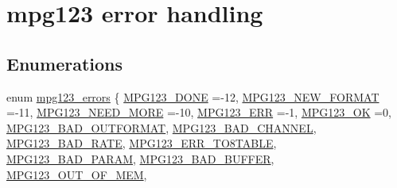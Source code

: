 \hypertarget{group__mpg123__error}{}\section{mpg123 error handling}
\label{group__mpg123__error}
\subsection*{Enumerations}
\begin{DoxyCompactItemize}
\item 
enum \hyperlink{group__mpg123__error_gac50432012aeaf7c23014de3198dfa5fd}{mpg123\+\_\+errors} \{ \newline
\hyperlink{group__mpg123__error_ggac50432012aeaf7c23014de3198dfa5fdaa70ae24fcae9de17ba5d7196898557ba}{M\+P\+G123\+\_\+\+D\+O\+NE} =-\/12, 
\hyperlink{group__mpg123__error_ggac50432012aeaf7c23014de3198dfa5fda843569efa962ea0e093bae7f190d1da6}{M\+P\+G123\+\_\+\+N\+E\+W\+\_\+\+F\+O\+R\+M\+AT} =-\/11, 
\hyperlink{group__mpg123__error_ggac50432012aeaf7c23014de3198dfa5fda094f4acef73ea2392e2e5d89df96a879}{M\+P\+G123\+\_\+\+N\+E\+E\+D\+\_\+\+M\+O\+RE} =-\/10, 
\hyperlink{group__mpg123__error_ggac50432012aeaf7c23014de3198dfa5fda416b4ef6c8cdc461fe210327819192cd}{M\+P\+G123\+\_\+\+E\+RR} =-\/1, 
\newline
\hyperlink{group__mpg123__error_ggac50432012aeaf7c23014de3198dfa5fdaf2a2fd03e8a2cc34d676f1a416f482e0}{M\+P\+G123\+\_\+\+OK} =0, 
\hyperlink{group__mpg123__error_ggac50432012aeaf7c23014de3198dfa5fda3b12600e50fbe0a81922ef28385890d4}{M\+P\+G123\+\_\+\+B\+A\+D\+\_\+\+O\+U\+T\+F\+O\+R\+M\+AT}, 
\hyperlink{group__mpg123__error_ggac50432012aeaf7c23014de3198dfa5fda2354f3320877398e294a3f140bbb1d24}{M\+P\+G123\+\_\+\+B\+A\+D\+\_\+\+C\+H\+A\+N\+N\+EL}, 
\hyperlink{group__mpg123__error_ggac50432012aeaf7c23014de3198dfa5fdafc8e025f961282382014c063f7c116dd}{M\+P\+G123\+\_\+\+B\+A\+D\+\_\+\+R\+A\+TE}, 
\newline
\hyperlink{group__mpg123__error_ggac50432012aeaf7c23014de3198dfa5fda14286499b7ef3f73012d084e64881896}{M\+P\+G123\+\_\+\+E\+R\+R\+\_\+T\+O8\+T\+A\+B\+LE}, 
\hyperlink{group__mpg123__error_ggac50432012aeaf7c23014de3198dfa5fda10a7e2cfe8420802ef929f0f152571f4}{M\+P\+G123\+\_\+\+B\+A\+D\+\_\+\+P\+A\+R\+AM}, 
\hyperlink{group__mpg123__error_ggac50432012aeaf7c23014de3198dfa5fda3f5d00bf75b553a9f3f96ab4b4bbf23b}{M\+P\+G123\+\_\+\+B\+A\+D\+\_\+\+B\+U\+F\+F\+ER}, 
\hyperlink{group__mpg123__error_ggac50432012aeaf7c23014de3198dfa5fda631e5674fd95abd99992b43bb91afa94}{M\+P\+G123\+\_\+\+O\+U\+T\+\_\+\+O\+F\+\_\+\+M\+EM}, 

\end{DoxyCompactItemize}
